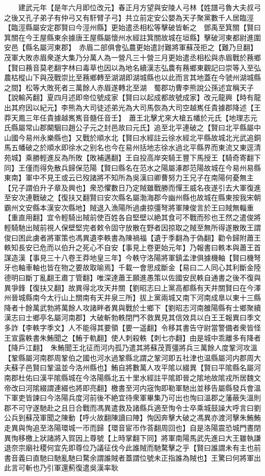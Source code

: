 　　建武元年【是年六月即位改元】春正月方望與安陵人弓林【姓譜弓魯大夫叔弓之後又孔子弟子有仲弓又有馯臂子弓】共立前定安公嬰為天子聚黨數千人居臨涇【臨涇縣屬安定郡賢曰今涇州縣】更始遣丞相松等擊破皆斬之　鄧禹至箕關【賢曰箕關在今王屋縣東余據唐王屋縣屬懷州水經註箕關故城在垣縣】擊破河東都尉進圍安邑【縣名屬河東郡】　赤眉二部俱會弘農更始遣討難將軍蘇茂拒之【難乃旦翻】茂軍大敗赤眉衆遂大集乃分萬人為一營凡三十營三月更始遣丞相松與赤眉戰於蓩鄉【賢曰蓩音莫老翻字林曰毒草也因以為地名續漢志弘農有蓩鄉東觀記曰崇等入至弘農枯樅山下與茂戰崇比至蓩鄉轉至湖湖即湖城縣也以此而言其地蓋在今虢州湖城縣之間】松等大敗死者三萬餘人赤眉遂轉北至湖　蜀郡功曹李熊說公孫述宜稱天子【說輸芮翻】夏四月述即帝位號成家【賢曰以起成都故號成家】改元龍興【時有龍出其府因以紀元】李熊為大司徒述弟光為大司馬恢為大司空越嶲任貴據郡降述【王莽天鳳三年任貴據越嶲嶲音髓任音壬】　蕭王北擊尤來大槍五幡於元氏【地理志元氏縣屬常山郡闞駰曰趙公子元之封邑故曰元氏】追至北平連破之【賢曰北平縣屬中山國今易州永樂縣也】又戰於順水北【賢曰水經註云徐水經北平縣故城北光武追銅馬五幡破之於順水即徐水之别名也今在易州括地志徐水過北平縣界而東流又東逕清苑城】乘勝輕進反為所敗【敗補邁翻】王自投高岸突騎王豐下馬授王【騎奇寄翻下同】王僅而得免散兵歸保范陽【賢曰縣名在范水之陽屬涿郡范陽故城在今易州易縣東南】軍中不見王或云已歿諸將不知所為吳漢曰卿曹努力王兄子在南陽何憂無主【兄子謂伯升子章及興也】衆恐懼數日乃定賊雖戰勝而憚王威名夜遂引去大軍復進至安次連戰破之【復扶又翻賢曰安次縣名屬渤海郡今幽州縣也故城在縣東按我宋朝霸州文安縣本漢安次縣地】賊退入漁陽所過虜掠彊弩將軍陳俊言於王曰賊無輜重【重直用翻】宜令輕騎出賊前使百姓各自堅壁以絶其食可不戰而殄也王然之遣俊將輕騎馳出賊前視人保壁堅完者敕令固守放散在野者因掠取之賊至無所得遂散敗王謂俊曰困此虜者將軍策也馮異遺李軼書為陳禍福【遺于季翻為于偽翻】勸令歸附蕭王軼知長安已危而以伯升之死心不自安【事見上卷更始元年】乃報書曰軼本與蕭王首謀造漢【事見三十八卷王莽地皇三年】今軼守洛陽將軍鎮孟津俱據機軸【賢曰機弩牙也軸車軸也皆在物之要故取喻焉】千載一會思成斷金【易曰二人同心其利斷金陸德明曰斷丁亂翻王肅丁管翻】唯深達蕭王願進愚策以佐國安民軼自通書之後不復與異爭鋒【復扶又翻】故異得北攻天井關【劉昭志曰上黨高都縣有天井關賢曰在今澤州晉城縣南今太行山上關南有天井泉三所】拔上黨兩城又南下河南成臯以東十三縣降者十餘萬武勃將萬餘人攻諸畔者異與戰於士鄉下【劉昭志河南雒陽縣有士鄉聚續漢志曰士鄉亭名屬河南郡】大破斬勃軼閉門不救異見其信效具以白王王報異曰季文多詐【李軼字季文】人不能得其要領【要一遥翻】令移其書告守尉當警備者衆皆怪王宣露軼書朱鮪聞之【鮪于軌翻】使人刺殺軼【刺七亦翻】由是城中乖離多有降者【降戶江翻】　朱鮪聞王北征而河内孤乃遣其將蘇茂賈彊將兵三萬餘人度鞏河攻溫【鞏縣屬河南郡周鞏伯之國也河水過鞏縣北謂之鞏河即五社津也温縣屬河内郡周大夫蘇子邑賢曰鞏温並今洛州縣也】鮪自將數萬人攻平隂以綴異【賢曰平隂縣名屬河南郡杜佑曰漢平隂縣城在今洛陽縣北五十里水經註平隂即晉之隂地故隂戎所居魏文帝改曰河隂綴謂連綴也將即亮翻】檄書至河内宼恂即勒軍馳出並移告屬縣發兵會溫下軍吏皆諫曰今洛陽兵度河前後不絶宜待衆軍畢集乃可出也恂曰溫郡之藩蔽失溫則郡不可守遂馳赴之且日合戰而馮異遣救及諸縣兵適至恂令士卒乘城鼓譟大呼言曰劉公兵到蘇茂軍聞之陳動【呼火故翻陳讀曰陣】恂因奔擊大破之馮異亦渡河擊朱鮪鮪走異與恂追至洛陽環城一帀而歸【環音宦帀作荅翻周回也】自是洛陽震恐城門晝閉異恂移檄上狀諸將入賀因上尊號【上時掌翻下同】將軍南陽馬武先進曰大王雖執謙退奈宗廟社稷何宜先即尊位乃議征伐今此誰賊而馳騖擊之乎【賢曰誰謂未有主也前書音義曰直馳曰馳亂馳曰騖余謂誰賊者蓋謂位號未正指誰為賊也】王驚曰何將軍出此言可斬也乃引軍還薊復遣吳漢率耿